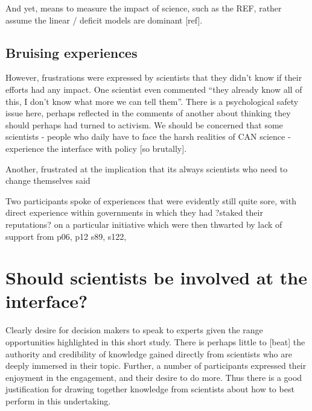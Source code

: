 And yet, means to measure the impact of science, such as the REF, rather assume the linear / deficit models are dominant [ref]. 

\subsection{Bruising experiences}\label{sec:disbruise}
However, frustrations were expressed by scientists that they didn't know if their efforts had any impact. One scientist even commented ``they already know all of this, I don't know what more we can tell them''. There is a psychological safety issue here, perhaps reflected in the comments of another about thinking they should perhaps had turned to activism. We should be concerned that some scientists - people who daily have to face the harsh realities of CAN science - experience the interface with policy [so brutally].

Another, frustrated at the implication that its always scientists who need to change themselves said 

Two participants spoke of experiences that were evidently still quite sore, with direct experience within governments in which they had ?staked their reputations? on a particular initiative which were then thwarted by lack of support from p06, p12 s89, s122, 

\section{Should scientists be involved at the interface?}
Clearly desire for decision makers to speak to experts given the range opportunities highlighted in this short study. There is perhaps little to [beat] the  authority and credibility of knowledge gained directly from scientists who are deeply immersed in their topic. Further, a number of participants expressed their enjoyment in the engagement, and their desire to do more. Thus there is a good justification for drawing together knowledge from scientists about how to best perform in this undertaking.

